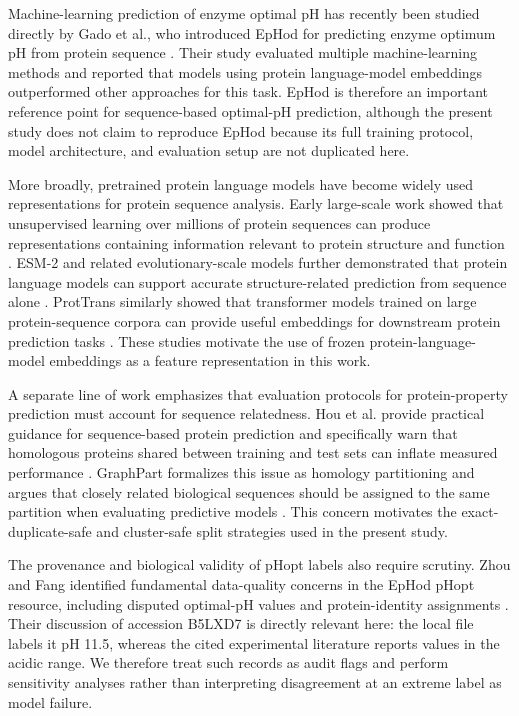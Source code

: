 Machine-learning prediction of enzyme optimal pH has recently been studied directly by Gado et al., who introduced EpHod for predicting enzyme optimum pH from protein sequence \cite{gado2025machine}. Their study evaluated multiple machine-learning methods and reported that models using protein language-model embeddings outperformed other approaches for this task. EpHod is therefore an important reference point for sequence-based optimal-pH prediction, although the present study does not claim to reproduce EpHod because its full training protocol, model architecture, and evaluation setup are not duplicated here.

More broadly, pretrained protein language models have become widely used representations for protein sequence analysis. Early large-scale work showed that unsupervised learning over millions of protein sequences can produce representations containing information relevant to protein structure and function \cite{rives2021biological}. ESM-2 and related evolutionary-scale models further demonstrated that protein language models can support accurate structure-related prediction from sequence alone \cite{lin2023evolutionary}. ProtTrans similarly showed that transformer models trained on large protein-sequence corpora can provide useful embeddings for downstream protein prediction tasks \cite{elnaggar2022prottrans}. These studies motivate the use of frozen protein-language-model embeddings as a feature representation in this work.

A separate line of work emphasizes that evaluation protocols for protein-property prediction must account for sequence relatedness. Hou et al. provide practical guidance for sequence-based protein prediction and specifically warn that homologous proteins shared between training and test sets can inflate measured performance \cite{hou2022ten}. GraphPart formalizes this issue as homology partitioning and argues that closely related biological sequences should be assigned to the same partition when evaluating predictive models \cite{teufel2023graphpart}. This concern motivates the exact-duplicate-safe and cluster-safe split strategies used in the present study.

The provenance and biological validity of pHopt labels also require scrutiny. Zhou and Fang identified fundamental data-quality concerns in the EpHod pHopt resource, including disputed optimal-pH values and protein-identity assignments \cite{zhou2026caution}. Their discussion of accession B5LXD7 is directly relevant here: the local file labels it pH 11.5, whereas the cited experimental literature reports values in the acidic range. We therefore treat such records as audit flags and perform sensitivity analyses rather than interpreting disagreement at an extreme label as model failure.

